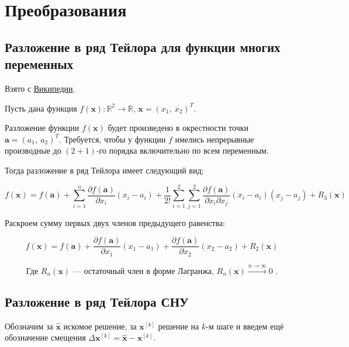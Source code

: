 \documentclass[12pt, a4paper]{article}
\begin{document}
\section{Преобразования}

\subsection{Разложение в ряд Тейлора для функции многих переменных}

Взято с \href{https://en.wikipedia.org/wiki/Taylor_series#Taylor_series_in_several_variables}{Википедии}.

Пусть дана функция $f(\mathbf{x}) : \mathbb{R}^2 \to \mathbb{R}$, $\mathbf{x} = (x_1,\ x_2)^T$.

Разложение функции $f(\mathbf{x})$ будет произведено в окрестности точки $\mathbf{a} = (a_1,\ a_2)^T$. Требуется, чтобы у функции $f$ имелись непрерывные производные до $(2+1)$-го порядка включительно по всем переменным.

Тогда разложение в ряд Тейлора имеет следующий вид:

\begin{equation}
f(\mathbf{x}) = f(\mathbf{a}) + \sum_{i = 1}^n \frac{\partial f(\mathbf{a})}{\partial x_i} (x_i - a_i) + \frac{1}{2!} \sum_{i = 1}^2\sum_{j = 1}^2 \frac{\partial f(\mathbf{a})}{\partial x_i \partial x_j} (x_i - a_i) (x_j - a_j) + R_3(\mathbf{x}) 
\end{equation}

Раскроем сумму первых двух членов предыдущего равенства:

\begin{equation}\label{taylor}
f(\mathbf{x}) = f(\mathbf{a}) + \frac{\partial f(\mathbf{a})}{\partial x_1} (x_1 - a_1) + \frac{\partial f(\mathbf{a})}{\partial x_2} (x_2 - a_2) + R_2(\mathbf{x})
\end{equation}

\begin{equation}\label{rtozero}
\text{Где } R_n(\mathbf{x}) \text{ --- остаточный член в форме Лагранжа, } R_n(\mathbf{x}) \xrightarrow{n\to \infty} 0 \text{ .}
\end{equation}

\subsection{Разложение в ряд Тейлора СНУ}

Обозначим за $\hat{\mathbf{x}}$ искомое решение, за $\mathbf{x}^{[k]}$ решение на $k$-м шаге и введем ещё обозначение смещения $\Delta\mathbf{x}^{[k]} = \hat{\mathbf{x}} - \mathbf{x}^{[k]}$.
\end{document}

